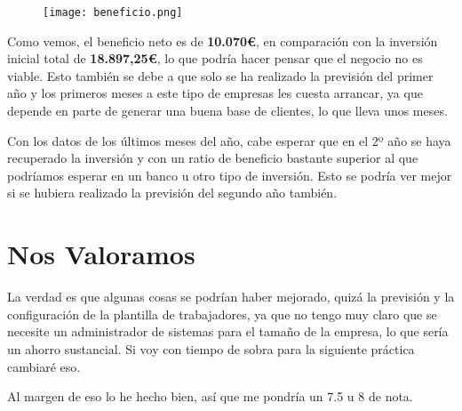 \begin{figure}[H]
    \centering
    \texttt{[image: beneficio.png]}
\end{figure}

Como vemos, el beneficio neto es de \textbf{10.070€}, en comparación con la inversión inicial total de \textbf{18.897,25€}, lo que podría hacer pensar que el negocio no es viable. Esto también se debe a que solo se ha realizado la previsión del primer año y los primeros meses a este tipo de empresas les cuesta arrancar,  ya que depende en parte de generar una buena base de clientes, lo que lleva unos meses.

Con los datos de los últimos meses del año, cabe esperar que en el 2º año se haya recuperado la inversión y con un ratio de beneficio bastante superior al que podríamos esperar en un banco u otro tipo de inversión. Esto se podría ver mejor si se hubiera realizado la previsión del segundo año también.

\section{Nos Valoramos}
La verdad es que algunas cosas se podrían haber mejorado, quizá la previsión y la configuración de la plantilla de trabajadores, ya que no tengo muy claro que se necesite un administrador de sistemas para el tamaño de la empresa, lo que sería un ahorro sustancial. Si voy con tiempo de sobra para la siguiente práctica cambiaré eso.

Al margen de eso lo he hecho bien, así que me pondría un 7.5 u 8 de nota.


%
%

